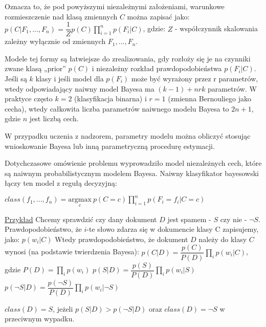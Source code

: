 Oznacza to, że pod powyższymi niezależnymi założeniami, warunkowe rozmieszczenie nad klasą zmiennych $ C $ można zapisać jako: \newline
$ p(C|F_1,...,F_n) = \dfrac{1}{Z} p(C) \prod_{i=1}^{n} p(F_i|C) $, gdzie:\newline
$ Z $ - współczynnik skalowania zależny wyłącznie od zmiennych $ F_1,...,F_n $.

Modele tej formy są łatwiejsze do zrealizowania, gdy rozłoży się je na czynniki zwane klasą „prior” $ p(C) $ i niezależny rozkład prawdopodobieństwa $ p(F_i|C) $. Jeśli są $ k $ klasy i jeśli model dla $ p(F_i) $ może być wyrażony przez r parametrów, wtedy odpowiadający naiwny model Bayesa ma $ (k-1) + nrk $ parametrów. W praktyce często $ k = 2 $ (klasyfikacja binarna) i $ r = 1 $ (zmienna Bernouliego jako cecha), wtedy całkowita liczba parametrów naiwnego modelu Bayesa to $ 2n+1 $, gdzie $ n $ jest liczbą cech. 

W przypadku uczenia z nadzorem, parametry modelu można obliczyć stosując wnioskowanie Bayesa lub inną parametryczną procedurę estymacji.

Dotychczasowe omówienie problemu wyprowadziło model niezależnych cech, które są naiwnym probabilistycznym modelem Bayesa. Naiwny klasyfikator bayesowski łączy ten model z regułą decyzyjną:\newline

$ class(f_1,...,f_n) = \underset{c}{\mathrm{argmax}} \ p(C = c)\prod_{i=1}^{n}p(F_i = f_i|C = c) $

\underline{Przykład}\newline
Chcemy sprawdzić czy dany dokument $ D $ jest spamem - $ S $ czy nie - $ \neg S $.  Prawdopodobieństwo, że $ i $-te słowo zdarza się w dokumencie klasy C zapisujemy, jako:\newline
$ p(w_i|C) $\newline
Wtedy prawdopodobieństwo, że dokument $ D $ należy do klasy $ C $ wynosi (na podstawie twierdzenia Bayesa):\newline
$ p(C|D) = \dfrac{p(C)}{P(D)} \prod_i p(w_i|C) $, gdzie $ P(D) = \prod_i p(w_i) $\newline
$ p(S|D) = \dfrac{p(S)}{P(D)} \prod_i p(w_i|S) $\newline
$ p(\neg S|D) = \dfrac{p(\neg S)}{P(D)} \prod_i p(w_i|\neg S) $\newline

$ class(D) = S $, jeżeli $ p(S|D) > p(\neg S|D) $ oraz $ class(D) = \neg S $ w przeciwnym wypadku.